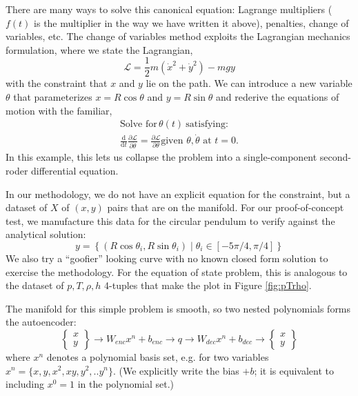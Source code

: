 \documentclass[AMA,STIX1COL]{WileyNJD-v2}
\begin{document}
There are many ways to solve this canonical equation: Lagrange
multipliers (\(f(t)\) is the multiplier in the way we have written it
above), penalties, change of variables, etc. The change of variables
method exploits the Lagrangian mechanics formulation, where we state
the Lagrangian,
\begin{equation}
\mathcal{L} = \frac{1}{2}m\left(\dot{x}^2 + \dot{y}^2\right) - m g y
\end{equation}
with the constraint that \(x\) and \(y\) lie on the path.
We can introduce a new variable \(\theta\) that parameterizes
\(x=R\cos\theta\) and \(y=R\sin\theta\) and rederive the equations of
motion with the familiar,
\begin{align}
\text{Solve for}\, \theta(t) \ \text{satisfying:} \nonumber \\
\frac{\mathrm{d}}{\mathrm{d}t} \frac{\partial \mathcal{L}}{\partial
  \dot{\theta}} =
  \frac{\partial \mathcal{L}}{\partial \theta}
   \text{given } \theta,\dot{\theta} \text{ at } t=0. \nonumber
\end{align}
In this example, this lets us collapse the problem into a
single-component second-roder differential equation.

In our methodology, we do not have an explicit equation for the
constraint, but a dataset of $X$ of $(x,y)$ pairs that are on the manifold. For
our proof-of-concept test, we manufacture this data for the circular
pendulum to verify against the analytical solution:
\begin{equation}
y = \left\{ (R\cos\theta_i, R\sin\theta_i)\; | \;\theta_i \in [-5\pi/4,\pi/4] \right\}
\end{equation}
We also try a ``goofier'' looking curve with no known closed form
solution to exercise the methodology.
For the equation of state problem, this is analogous to the dataset
of $p,T,\rho,h$ 4-tuples that make the plot in Figure \ref{fig:pTrho}.

The manifold for this simple problem is smooth, so two nested
polynomials forms the autoencoder:
\[\left\{\begin{array}{c} x\\y\end{array}\right\}
\rightarrow W_{enc} x^n +b_{enc}\rightarrow q \rightarrow W_{dec} x^n +b_{dec}\rightarrow 
\left\{\begin{array}{c} x\\y\end{array}\right\}\]
where $x^n$ denotes a polynomial basis set, e.g. for two variables $x^n=\{x,y,x^2,xy,y^2,..y^n\}$.
(We explicitly write the bias \(+b\); it is equivalent to including
\(x^0=1\) in the polynomial set.) 
\end{document}

